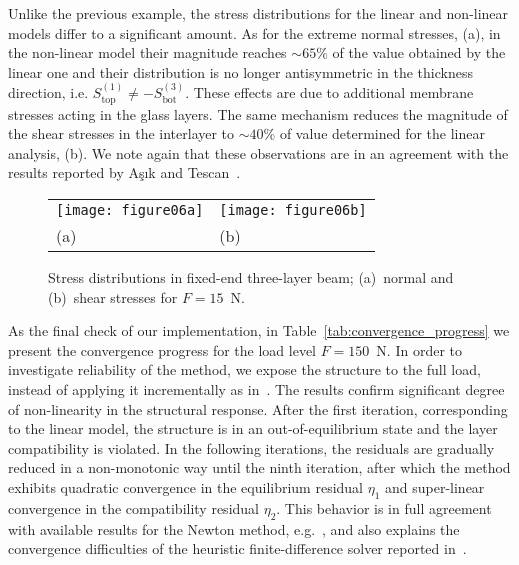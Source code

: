 \documentclass[11pt]{article}
\newcommand{\rev}[1]{#1}
\newcommand{\lay}[1]{^{(#1)}}
\newcommand{\Tref}[1]{Table~\ref{#1}}
\begin{document}
\rev{Unlike the previous example, the stress distributions for the linear and
non-linear models differ to a significant amount. As for the extreme normal
stresses, \Fref{fig:stress_distrib}(a), in the non-linear model their magnitude
reaches $\sim 65\%$ of the value obtained by the linear one and their
distribution is no longer antisymmetric in the thickness direction, i.e.
$S_\mathrm{top}\lay{1} \neq - S_\mathrm{bot}\lay{3}$. These effects are due to
additional membrane stresses acting in the glass layers. The same mechanism
reduces the magnitude of the shear stresses in the interlayer to $\sim 40\%$ of
value determined for the linear analysis, \Fref{fig:stress_distrib}(b). We note
again that these observations are in an agreement with the results reported by
A\c{s}\i{}k and Tescan~\cite{Asik:2005:MMB}.}

\begin{figure}[h]
\begin{tabular}{ll}
\texttt{[image: figure06a]} & 
\texttt{[image: figure06b]} \\[-2mm]
(a) & (b)
\end{tabular}
\caption{\rev{Stress distributions in fixed-end three-layer beam; (a)~normal and
(b)~shear stresses for $F=15$~N.}}
\label{fig:stress_distrib}
\end{figure}


As the final check of our implementation, in \Tref{tab:convergence_progress} we
present the convergence progress for the load level $F = 150$~N. In order to
investigate reliability of the method, we expose the structure to the full load,
instead of applying it incrementally as in~\cite{Asik:2005:MMB}. The results
confirm significant degree of non-linearity in the structural response. After
the first iteration, corresponding to the linear model, the structure is in an
out-of-equilibrium state and the layer compatibility is violated. In the
following iterations, the residuals are gradually reduced \rev{in a
non-monotonic way} until the ninth iteration, after which the method exhibits
quadratic convergence in the equilibrium residual $\eta_1$ and super-linear
convergence in the compatibility residual $\eta_2$. This behavior is in full
agreement with available results for the Newton method,
e.g.~\cite[Theorem~13.6]{Bonnans:2003:NOTPA}, and also explains the convergence
difficulties of the heuristic finite-difference solver reported
in~\cite{Asik:2005:MMB}.
\end{document}
